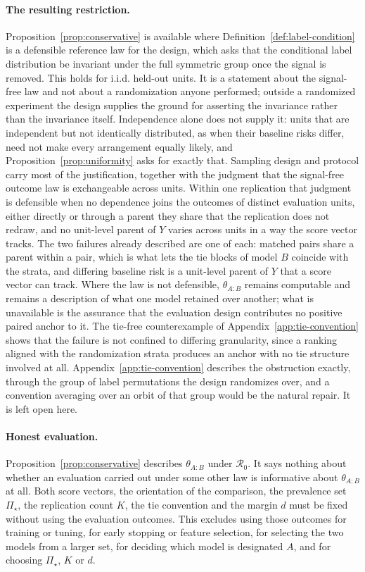 \documentclass[11pt]{article}
\newcommand{\Regime}{\mathcal{R}}
\newcommand{\PSet}{\Pi_\star}
\theoremstyle{remark}
\begin{document}
\paragraph{The resulting restriction.}
Proposition~\ref{prop:conservative} is available where Definition~\ref{def:label-condition} is a defensible reference law for the design, which asks that the conditional label distribution be invariant under the full symmetric group once the signal is removed. This holds for i.i.d. held-out units. It is a statement about the signal-free law and not about a randomization anyone performed; outside a randomized experiment the design supplies the ground for asserting the invariance rather than the invariance itself. Independence alone does not supply it: units that are independent but not identically distributed, as when their baseline risks differ, need not make every arrangement equally likely, and Proposition~\ref{prop:uniformity} asks for exactly that. Sampling design and protocol carry most of the justification, together with the judgment that the signal-free outcome law is exchangeable across units. Within one replication that judgment is defensible when no dependence joins the outcomes of distinct evaluation units, either directly or through a parent they share that the replication does not redraw, and no unit-level parent of $Y$ varies across units in a way the score vector tracks. The two failures already described are one of each: matched pairs share a parent within a pair, which is what lets the tie blocks of model $B$ coincide with the strata, and differing baseline risk is a unit-level parent of $Y$ that a score vector can track. Where the law is not defensible, $\theta_{A:B}$ remains computable and remains a description of what one model retained over another; what is unavailable is the assurance that the evaluation design contributes no positive paired anchor to it. The tie-free counterexample of Appendix~\ref{app:tie-convention} shows that the failure is not confined to differing granularity, since a ranking aligned with the randomization strata produces an anchor with no tie structure involved at all. Appendix~\ref{app:tie-convention} describes the obstruction exactly, through the group of label permutations the design randomizes over, and a convention averaging over an orbit of that group would be the natural repair. It is left open here.

\paragraph{Honest evaluation.}
Proposition~\ref{prop:conservative} describes $\theta_{A:B}$ under $\Regime_0$. It says nothing about whether an evaluation carried out under some other law is informative about $\theta_{A:B}$ at all. Both score vectors, the orientation of the comparison, the prevalence set $\PSet$, the replication count $K$, the tie convention and the margin $d$ must be fixed without using the evaluation outcomes. This excludes using those outcomes for training or tuning, for early stopping or feature selection, for selecting the two models from a larger set, for deciding which model is designated $A$, and for choosing $\PSet$, $K$ or $d$.
\end{document}
